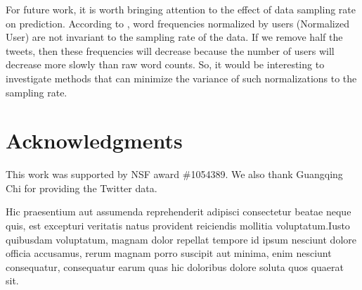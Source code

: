 \documentclass[letterpaper]{article}
\begin{document}
For future work, it is worth bringing attention to the effect of data sampling rate on prediction. According to \citeauthor{eisenstein2014diffusion} , word frequencies normalized by users (Normalized User) are not invariant to the sampling rate of the data. If we remove half the tweets, then these frequencies will decrease because the number of users will decrease more slowly than raw word counts. So, it would be interesting to investigate methods that can minimize the variance of such normalizations to the sampling rate.

\section{Acknowledgments}
This work was supported by NSF award \#1054389. We also thank Guangqing Chi for providing the Twitter data.


\fontsize{9.0pt}{10.0pt}
\selectfont
Hic praesentium aut assumenda reprehenderit adipisci consectetur beatae neque quis, est excepturi veritatis natus provident reiciendis mollitia voluptatum.Iusto quibusdam voluptatum, magnam dolor repellat tempore id ipsum nesciunt dolore officia accusamus, rerum magnam porro suscipit aut minima, enim nesciunt consequatur, consequatur earum quas hic doloribus dolore soluta quos quaerat sit.\clearpage


\end{document}
